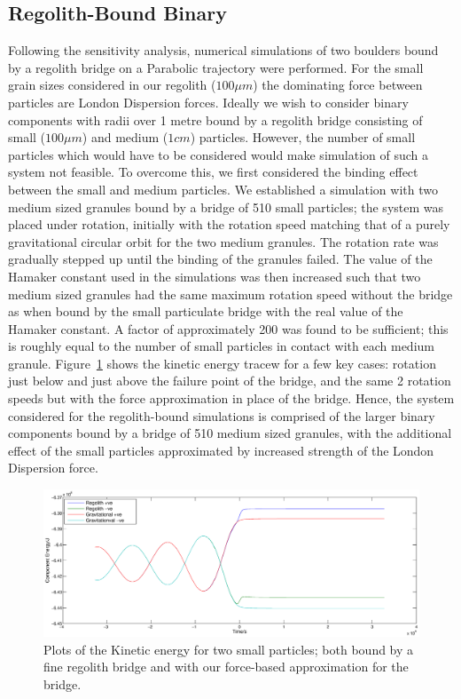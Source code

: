 \documentclass[letterpaper, preprint, paper,11pt]{AAS}	%
\begin{document}
\subsection{Regolith-Bound Binary}
Following the sensitivity analysis, numerical simulations of two boulders bound by a regolith bridge on a Parabolic trajectory were performed. For the small grain sizes considered in our regolith ($100\mu m$) the dominating force between particles are London Dispersion forces. Ideally we wish to consider binary components with radii over 1 metre bound by a regolith bridge consisting of small ($100\mu m$) and medium ($1cm$) particles. However, the number of small particles which would have to be considered would make simulation of such a system not feasible. To overcome this, we first considered the binding effect between the small and medium particles. We established a simulation with two medium sized granules bound by a bridge of 510 small particles; the system was placed under rotation, initially with the rotation speed matching that of a purely gravitational circular orbit for the two medium granules. The rotation rate was gradually stepped up until the binding of the granules failed. The value of the Hamaker constant used in the simulations was then increased such that two medium sized granules had the same maximum rotation speed without the bridge as when bound by the small particulate bridge with the real value of the Hamaker constant. A factor of approximately 200 was found to be sufficient; this is roughly equal to the number of small particles in contact with each medium granule. Figure~\ref{fig:dustyspin} shows the kinetic energy tracew for a few key cases: rotation just below and just above the failure point of the bridge, and the same 2 rotation speeds but with the force approximation in place of the bridge. Hence, the system considered for the regolith-bound simulations is comprised of the larger binary components bound by a bridge of 510 medium sized granules, with the additional effect of the small particles approximated by increased strength of the London Dispersion force.  
\begin{figure}[H]
\centering
\centerline{\includegraphics[width=1.2\textwidth]{regolith_v_gravitational.eps}} 
\caption{Plots of the Kinetic energy for two small particles; both bound by a fine regolith bridge and with our force-based approximation for the bridge.} 
\label{fig:dustyspin}
\end{figure}
  
\end{document}
